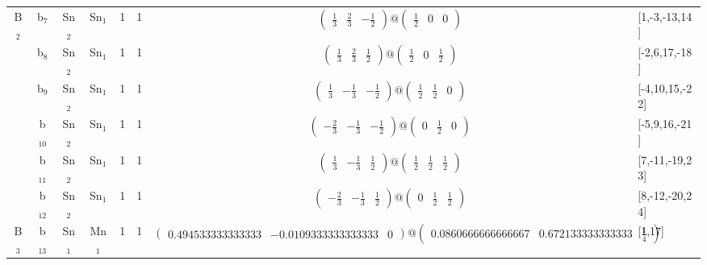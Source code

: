 \documentclass[fleqn,10pt,landscape]{article}
\begin{document}
\begin{itemize}
\begin{center}
\begin{longtable}{cc|cc|c|c|c|l}
B$_{2}$ & b$_{7}$ & Sn$_{2}$ & Sn$_{1}$ & 1 & 1 & $\begin{pmatrix} \frac{1}{3} & \frac{2}{3} & - \frac{1}{2} \end{pmatrix}@\begin{pmatrix} \frac{1}{2} & 0 & 0 \end{pmatrix}$ & [1,-3,-13,14] \\
& b$_{8}$ & Sn$_{2}$ & Sn$_{1}$ & 1 & 1 & $\begin{pmatrix} \frac{1}{3} & \frac{2}{3} & \frac{1}{2} \end{pmatrix}@\begin{pmatrix} \frac{1}{2} & 0 & \frac{1}{2} \end{pmatrix}$ & [-2,6,17,-18] \\
& b$_{9}$ & Sn$_{2}$ & Sn$_{1}$ & 1 & 1 & $\begin{pmatrix} \frac{1}{3} & - \frac{1}{3} & - \frac{1}{2} \end{pmatrix}@\begin{pmatrix} \frac{1}{2} & \frac{1}{2} & 0 \end{pmatrix}$ & [-4,10,15,-22] \\
& b$_{10}$ & Sn$_{2}$ & Sn$_{1}$ & 1 & 1 & $\begin{pmatrix} - \frac{2}{3} & - \frac{1}{3} & - \frac{1}{2} \end{pmatrix}@\begin{pmatrix} 0 & \frac{1}{2} & 0 \end{pmatrix}$ & [-5,9,16,-21] \\
& b$_{11}$ & Sn$_{2}$ & Sn$_{1}$ & 1 & 1 & $\begin{pmatrix} \frac{1}{3} & - \frac{1}{3} & \frac{1}{2} \end{pmatrix}@\begin{pmatrix} \frac{1}{2} & \frac{1}{2} & \frac{1}{2} \end{pmatrix}$ & [7,-11,-19,23] \\
& b$_{12}$ & Sn$_{2}$ & Sn$_{1}$ & 1 & 1 & $\begin{pmatrix} - \frac{2}{3} & - \frac{1}{3} & \frac{1}{2} \end{pmatrix}@\begin{pmatrix} 0 & \frac{1}{2} & \frac{1}{2} \end{pmatrix}$ & [8,-12,-20,24] \\ \hline
B$_{3}$ & b$_{13}$ & Sn$_{1}$ & Mn$_{1}$ & 1 & 1 & $\begin{pmatrix} 0.494533333333333 & -0.0109333333333333 & 0 \end{pmatrix}@\begin{pmatrix} 0.0860666666666667 & 0.672133333333333 & \frac{1}{4} \end{pmatrix}$ & [1,17] \\

\end{longtable}
\end{center}
\end{itemize}
\end{document}

